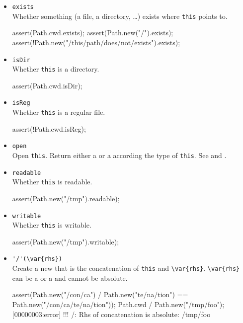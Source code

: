 \begin{itemize}
\item \lstinline|exists|\\
  Whether something (a file, a directory, \ldots) exists where
  \lstinline|this| points to.
\begin{urbiscript}[firstnumber=last]
assert(Path.cwd.exists);
assert(Path.new("/").exists);
assert(!Path.new("/this/path/does/not/exists").exists);
\end{urbiscript}

\item \lstinline|isDir|\\
  Whether \lstinline|this| is a directory.
\begin{urbiscript}[firstnumber=last]
assert(Path.cwd.isDir);
\end{urbiscript}

\item \lstinline|isReg|\\
  Whether \lstinline|this| is a regular file.
\begin{urbiscript}[firstnumber=last]
assert(!Path.cwd.isReg);
\end{urbiscript}

\item \lstinline|open|\\
  Open \lstinline|this|. Return either a  or a
   according the type of \lstinline|this|. See
   and .

\item \lstinline|readable|\\
  Whether \lstinline|this| is readable.
\begin{urbiscript}[firstnumber=last]
assert(Path.new("/tmp").readable);
\end{urbiscript}

\item \lstinline|writable|\\
  Whether \lstinline|this| is writable.
\begin{urbiscript}[firstnumber=last]
assert(Path.new("/tmp").writable);
\end{urbiscript}

\item \lstinline|'/'(\var{rhs})|\\
  Create a new  that is the concatenation of
  \lstinline|this| and \lstinline|\var{rhs}|. \lstinline|\var{rhs}|
  can be a  or a  and cannot be absolute.
\begin{urbiscript}[firstnumber=last]
assert(Path.new("/con/ca") / Path.new("te/na/tion")
       == Path.new("/con/ca/te/na/tion"));
Path.cwd / Path.new("/tmp/foo");
[00000003:error] !!! /: Rhs of concatenation is absolute: /tmp/foo
\end{urbiscript}


\end{itemize}
